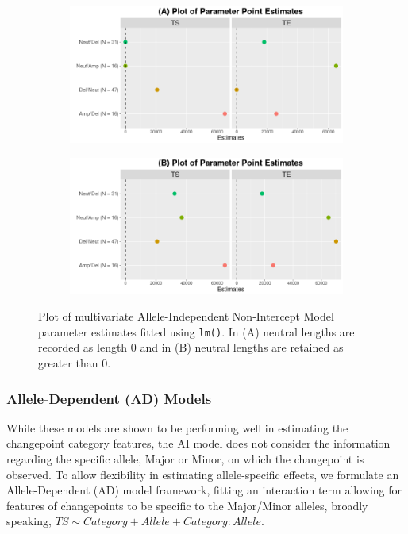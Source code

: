 \begin{figure}[H]
\vspace{0.5cm}
     \begin{subfigure}[t]{.49\textwidth}
      \centering
      \includegraphics[width = 1\textwidth]{../figures/Chapter_5/Multivariate_lm_6_AI_Interval.png}
    \end{subfigure}%
     \begin{subfigure}[t]{.49\textwidth}
      \centering
       \includegraphics[width = 1\textwidth]{../figures/Chapter_5/Multivariate_lm_6_Neut_AI_Interval.png}
    \end{subfigure} 
     \caption[Plot of multivariate Allele-Independent Non-Intercept Model parameter estimates fitted using \texttt{lm()}.]{Plot of multivariate Allele-Independent Non-Intercept Model parameter estimates fitted using \texttt{lm()}. In (A) neutral lengths are recorded as length 0 and in (B) neutral lengths are retained as greater than 0.}
     \label{fig:lm_multi_2_int}
\end{figure}

\subsubsection{Allele-Dependent (AD) Models}
While these models are shown to be performing well in estimating the changepoint category features, the AI model does not consider the information regarding the specific allele, Major or Minor, on which the changepoint is observed. To allow flexibility in estimating allele-specific effects, we formulate an Allele-Dependent (AD) model framework, fitting an interaction term allowing for features of changepoints to be specific to the Major/Minor alleles, broadly speaking, $TS\sim Category + Allele + Category:Allele$.  

